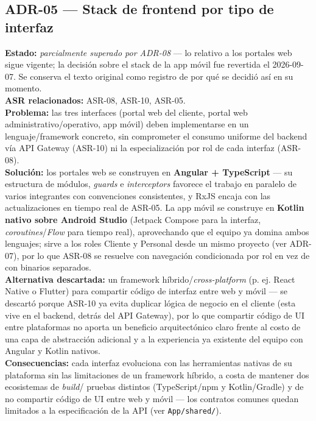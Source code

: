 \documentclass[11pt,a4paper]{article}
\begin{document}
\subsection*{ADR-05 --- Stack de frontend por tipo de interfaz}
\textbf{Estado:} \textit{parcialmente superado por ADR-08} --- lo relativo a los portales web sigue
vigente; la decisión sobre el stack de la app móvil fue revertida el 2026-09-07. Se conserva el
texto original como registro de por qué se decidió así en su momento.\\
\textbf{ASR relacionados:} ASR-08, ASR-10, ASR-05.\\
\textbf{Problema:} las tres interfaces (portal web del cliente, portal web administrativo/operativo,
app móvil) deben implementarse en un lenguaje/framework concreto, sin comprometer el consumo
uniforme del backend vía API Gateway (ASR-10) ni la especialización por rol de cada interfaz
(ASR-08).\\
\textbf{Solución:} los portales web se construyen en \textbf{Angular + TypeScript} — su estructura de
módulos, \textit{guards} e \textit{interceptors} favorece el trabajo en paralelo de varios
integrantes con convenciones consistentes, y RxJS encaja con las actualizaciones en tiempo real de
ASR-05. La app móvil se construye en \textbf{Kotlin nativo sobre Android Studio} (Jetpack
Compose para la interfaz, \textit{coroutines}/\textit{Flow} para tiempo real), aprovechando que el
equipo ya domina ambos lenguajes; sirve a los roles Cliente y Personal desde un mismo proyecto
(ver ADR-07), por lo que ASR-08 se resuelve con navegación condicionada por rol en vez de con
binarios separados.\\
\textbf{Alternativa descartada:} un framework híbrido/\textit{cross-platform} (p. ej. React Native o
Flutter) para compartir código de interfaz entre web y móvil — se descartó porque ASR-10 ya evita
duplicar lógica de negocio en el cliente (esta vive en el backend, detrás del API Gateway), por lo
que compartir código de UI entre plataformas no aporta un beneficio arquitectónico claro frente al
costo de una capa de abstracción adicional y a la experiencia ya existente del equipo con Angular y
Kotlin nativos.\\
\textbf{Consecuencias:} cada interfaz evoluciona con las herramientas nativas de su plataforma sin
las limitaciones de un framework híbrido, a costa de mantener dos ecosistemas de \textit{build}/
pruebas distintos (TypeScript/npm y Kotlin/Gradle) y de no compartir código de UI entre web y móvil
— los contratos comunes quedan limitados a la especificación de la API (ver \texttt{App/shared/}).
\end{document}
